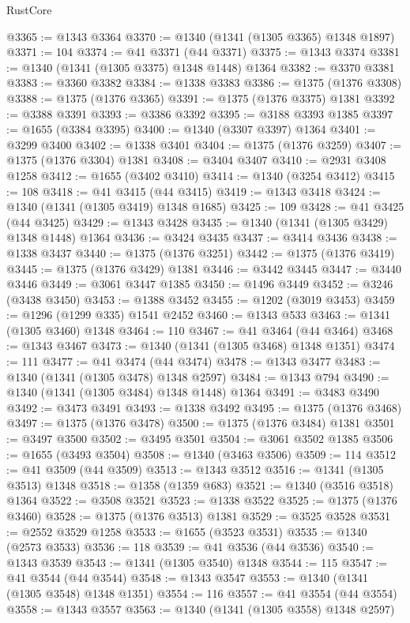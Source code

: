 \begin{lexlean}{RustCore}
\begin{coremodule}
@3365 := @1343 @3364
@3370 := @1340 (@1341 (@1305 @3365) @1348 @1897)
@3371 := 104
@3374 := @41 @3371 (@44 @3371)
@3375 := @1343 @3374
@3381 := @1340 (@1341 (@1305 @3375) @1348 @1448) @1364
@3382 := @3370 @3381
@3383 := @3360 @3382
@3384 := @1338 @3383
@3386 := @1375 (@1376 @3308)
@3388 := @1375 (@1376 @3365)
@3391 := @1375 (@1376 @3375) @1381
@3392 := @3388 @3391
@3393 := @3386 @3392
@3395 := @3188 @3393 @1385
@3397 := @1655 (@3384 @3395)
@3400 := @1340 (@3307 @3397) @1364
@3401 := @3299 @3400
@3402 := @1338 @3401
@3404 := @1375 (@1376 @3259)
@3407 := @1375 (@1376 @3304) @1381
@3408 := @3404 @3407
@3410 := @2931 @3408 @1258
@3412 := @1655 (@3402 @3410)
@3414 := @1340 (@3254 @3412)
@3415 := 108
@3418 := @41 @3415 (@44 @3415)
@3419 := @1343 @3418
@3424 := @1340 (@1341 (@1305 @3419) @1348 @1685)
@3425 := 109
@3428 := @41 @3425 (@44 @3425)
@3429 := @1343 @3428
@3435 := @1340 (@1341 (@1305 @3429) @1348 @1448) @1364
@3436 := @3424 @3435
@3437 := @3414 @3436
@3438 := @1338 @3437
@3440 := @1375 (@1376 @3251)
@3442 := @1375 (@1376 @3419)
@3445 := @1375 (@1376 @3429) @1381
@3446 := @3442 @3445
@3447 := @3440 @3446
@3449 := @3061 @3447 @1385
@3450 := @1496 @3449
@3452 := @3246 (@3438 @3450)
@3453 := @1388 @3452
@3455 := @1202 (@3019 @3453)
@3459 := @1296 (@1299 @335) @1541 @2452
@3460 := @1343 @533
@3463 := @1341 (@1305 @3460) @1348
@3464 := 110
@3467 := @41 @3464 (@44 @3464)
@3468 := @1343 @3467
@3473 := @1340 (@1341 (@1305 @3468) @1348 @1351)
@3474 := 111
@3477 := @41 @3474 (@44 @3474)
@3478 := @1343 @3477
@3483 := @1340 (@1341 (@1305 @3478) @1348 @2597)
@3484 := @1343 @794
@3490 := @1340 (@1341 (@1305 @3484) @1348 @1448) @1364
@3491 := @3483 @3490
@3492 := @3473 @3491
@3493 := @1338 @3492
@3495 := @1375 (@1376 @3468)
@3497 := @1375 (@1376 @3478)
@3500 := @1375 (@1376 @3484) @1381
@3501 := @3497 @3500
@3502 := @3495 @3501
@3504 := @3061 @3502 @1385
@3506 := @1655 (@3493 @3504)
@3508 := @1340 (@3463 @3506)
@3509 := 114
@3512 := @41 @3509 (@44 @3509)
@3513 := @1343 @3512
@3516 := @1341 (@1305 @3513) @1348
@3518 := @1358 (@1359 @683)
@3521 := @1340 (@3516 @3518) @1364
@3522 := @3508 @3521
@3523 := @1338 @3522
@3525 := @1375 (@1376 @3460)
@3528 := @1375 (@1376 @3513) @1381
@3529 := @3525 @3528
@3531 := @2552 @3529 @1258
@3533 := @1655 (@3523 @3531)
@3535 := @1340 (@2573 @3533)
@3536 := 118
@3539 := @41 @3536 (@44 @3536)
@3540 := @1343 @3539
@3543 := @1341 (@1305 @3540) @1348
@3544 := 115
@3547 := @41 @3544 (@44 @3544)
@3548 := @1343 @3547
@3553 := @1340 (@1341 (@1305 @3548) @1348 @1351)
@3554 := 116
@3557 := @41 @3554 (@44 @3554)
@3558 := @1343 @3557
@3563 := @1340 (@1341 (@1305 @3558) @1348 @2597)

\end{coremodule}
\end{lexlean}
